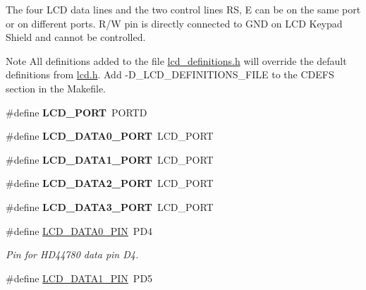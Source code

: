 The four L\+CD data lines and the two control lines RS, E can be on the same port or on different ports. R/W pin is directly connected to G\+ND on L\+CD Keypad Shield and cannot be controlled.

\begin{DoxyNote}{Note}
All definitions added to the file \hyperlink{a00004}{lcd\+\_\+definitions.\+h} will override the default definitions from \hyperlink{a00003}{lcd.\+h}. Add -\/\+D\+\_\+\+L\+C\+D\+\_\+\+D\+E\+F\+I\+N\+I\+T\+I\+O\+N\+S\+\_\+\+F\+I\+LE to the C\+D\+E\+FS section in the Makefile. 
\end{DoxyNote}
\begin{DoxyCompactItemize}
\item 
\#define {\bfseries L\+C\+D\+\_\+\+P\+O\+RT}~P\+O\+R\+TD\hypertarget{a00011_gabcf42bd88b3c36193f301ca25b033875}{}\label{a00011_gabcf42bd88b3c36193f301ca25b033875}

\item 
\#define {\bfseries L\+C\+D\+\_\+\+D\+A\+T\+A0\+\_\+\+P\+O\+RT}~L\+C\+D\+\_\+\+P\+O\+RT\hypertarget{a00011_gafc0acd4774bcd311595732f5367e266b}{}\label{a00011_gafc0acd4774bcd311595732f5367e266b}

\item 
\#define {\bfseries L\+C\+D\+\_\+\+D\+A\+T\+A1\+\_\+\+P\+O\+RT}~L\+C\+D\+\_\+\+P\+O\+RT\hypertarget{a00011_ga345af0248d5739bd8896d4f585618ca2}{}\label{a00011_ga345af0248d5739bd8896d4f585618ca2}

\item 
\#define {\bfseries L\+C\+D\+\_\+\+D\+A\+T\+A2\+\_\+\+P\+O\+RT}~L\+C\+D\+\_\+\+P\+O\+RT\hypertarget{a00011_ga4d5c48a3f2b9426c14bbca3150834a20}{}\label{a00011_ga4d5c48a3f2b9426c14bbca3150834a20}

\item 
\#define {\bfseries L\+C\+D\+\_\+\+D\+A\+T\+A3\+\_\+\+P\+O\+RT}~L\+C\+D\+\_\+\+P\+O\+RT\hypertarget{a00011_gaec71b6692f2af7c9de32dbe85fcb51c2}{}\label{a00011_gaec71b6692f2af7c9de32dbe85fcb51c2}

\item 
\#define \hyperlink{a00011_gafe54d7d886b5c56bed0cf971febbb773}{L\+C\+D\+\_\+\+D\+A\+T\+A0\+\_\+\+P\+IN}~P\+D4\hypertarget{a00011_gafe54d7d886b5c56bed0cf971febbb773}{}\label{a00011_gafe54d7d886b5c56bed0cf971febbb773}

\begin{DoxyCompactList}\small\item\em Pin for H\+D44780 data pin D4. \end{DoxyCompactList}\item 
\#define \hyperlink{a00011_ga97fb520e7b83bb047ac5c9247de57049}{L\+C\+D\+\_\+\+D\+A\+T\+A1\+\_\+\+P\+IN}~P\+D5\hypertarget{a00011_ga97fb520e7b83bb047ac5c9247de57049}{}\label{a00011_ga97fb520e7b83bb047ac5c9247de57049}


\end{DoxyCompactItemize}

